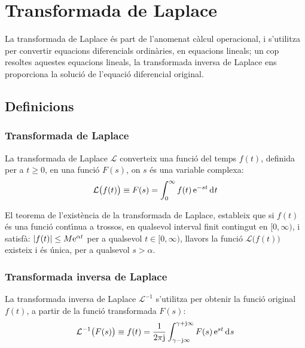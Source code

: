 \chapter{Transformada de
Laplace}\label{sec:laplace}

La transformada de Laplace \'{e}s part de l'anomenat c\`{a}lcul operacional,
i s'utilitza per convertir equacions diferencials ordin\`{a}ries, en
equacions lineals; un cop resoltes aquestes equacions lineals, la
transformada inversa de Laplace ens proporciona la soluci\'{o} de
l'equaci\'{o} diferencial original.

\section{Definicions}

\subsection{Transformada de Laplace}

La transformada de Laplace $\mathcal{L}$  converteix una funci\'{o} del
temps $f(t)$, definida per a $t\geq 0$, en una funci\'{o} $F(s)$, on $s$
\'{e}s una variable complexa:
\begin{equation}
    \mathcal{L}\bigl(f(t)\bigr) \equiv F(s) = \int_0^\infty f(t) \,\eu^{-s t} \diff
    t \label{eq:transf_laplace}
\end{equation}

El teorema de l'exist\`{e}ncia de la transformada de Laplace, estableix
que si $f(t)$ \'{e}s una funci\'{o} cont\'{\i}nua a trossos, en qualsevol
interval finit contingut en $[0,\infty)$, i satisf\`{a}: $|f(t)| \leq M
\mathrm{e}^{\alpha t}$ per a qualsevol $t \in [0,\infty)$, llavors la
funci\'{o} $\mathcal{L}\bigl(f(t)\bigr)$ existeix i \'{e}s \'{u}nica, per a
qualsevol $s > \alpha$.

\subsection{Transformada inversa de Laplace}

La transformada inversa de Laplace $\mathcal{L}^{-1}$ s'utilitza per
obtenir la funci\'{o} original $f(t)$, a partir de la funci\'{o}
transformada $F(s)$:
\begin{equation}
    \mathcal{L}^{-1}\bigl(F(s)\bigr) \equiv f(t) = \frac{1}{2 \pi \ju }
    \int_{\gamma-\ju \infty}^{\gamma+\ju \infty} F(s)\, \eu^{s t} \diff
    s \label{eq:transf_inv_laplace}
\end{equation}

